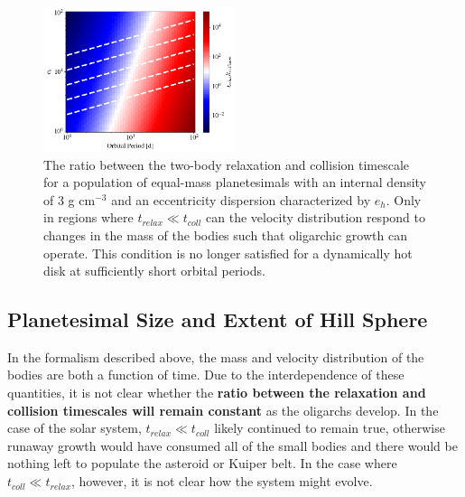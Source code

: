 \documentclass[twocolumn,linenumbers]{aastex63}
\begin{document}
\begin{figure}
\begin{center}
    \includegraphics[width=0.5\textwidth]{figures/timescales.png}
    \caption{The ratio between the two-body relaxation and collision
      timescale for a population of equal-mass planetesimals with an
      internal density of 3 g cm$^{-3}$ and an eccentricity dispersion
      characterized by $e_h$. Only in regions where $t_{relax} \ll t_{coll}$ can 
      the velocity distribution respond to changes in the mass of the bodies such
      that oligarchic growth can operate. This condition is no longer satisfied for a dynamically hot disk at sufficiently short orbital periods.\label{fig:timescales}}
\end{center}
\end{figure}

\subsection{Planetesimal Size and Extent of Hill Sphere}\label{sec:sizeandhill}

In the formalism described above, the mass and velocity distribution
of the bodies are both a function of time. Due to the interdependence
of these quantities, it is not clear whether the \textbf{ratio between the relaxation and collision timescales will remain constant} as the
oligarchs develop. In the case of the solar system, $t_{relax} \ll t_{coll}$ likely continued to remain true, otherwise runaway 
growth would have consumed all of the small bodies and there would be nothing left to populate the asteroid or Kuiper belt. In 
the case where $t_{coll} \ll t_{relax}$, however, it is not clear how the system might evolve.
\end{document}
